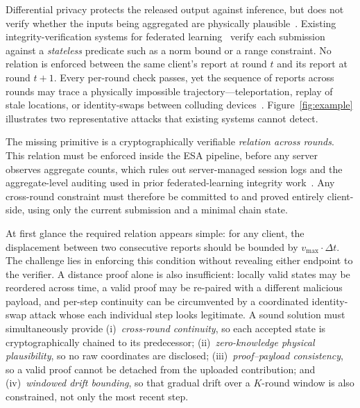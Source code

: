 \documentclass[conference]{IEEEtran}
\theoremstyle{definition}
\theoremstyle{plain}
\begin{document}
Differential privacy protects the released output against inference, but
does not verify whether the inputs being aggregated are physically
plausible~\cite{Dwork2014algorithmic}.
Existing integrity-verification systems for federated
learning~\cite{Pillutla2024RiseFL,Wang2024ZKSL,Lycklama2023RoFL,Chowdhury2022EIFFeL}
verify each submission against a \emph{stateless} predicate such as a
norm bound or a range constraint.
No relation is enforced between the same client's report at round $t$
and its report at round $t{+}1$.
Every per-round check passes, yet the sequence of reports across rounds
may trace a physically impossible trajectory---teleportation, replay of
stale locations, or identity-swaps between colluding
devices~\cite{Douceur2002Sybil}.
Figure~\ref{fig:example} illustrates two representative attacks that
existing systems cannot detect.

The missing primitive is a cryptographically verifiable \emph{relation
across rounds}.
This relation must be enforced inside the ESA pipeline, before any
server observes aggregate counts, which rules out server-managed session
logs and the aggregate-level auditing used in prior federated-learning
integrity
work~\cite{Lycklama2023RoFL,Bell2023ACORN}.
Any cross-round constraint must therefore be committed to and proved
entirely client-side, using only the current submission and a minimal
chain state.

At first glance the required relation appears simple:
for any client, the displacement between two consecutive reports should
be bounded by $v_{\max}\!\cdot\!\Delta t$.
The challenge lies in enforcing this condition without revealing either
endpoint to the verifier.
A distance proof alone is also insufficient: locally valid states may be
reordered across time, a valid proof may be re-paired with a different
malicious payload, and per-step continuity can be circumvented by
a coordinated identity-swap attack whose each individual step looks
legitimate.
A sound solution must simultaneously provide (i)~\emph{cross-round
continuity}, so each accepted state is cryptographically chained to its
predecessor; (ii)~\emph{zero-knowledge physical plausibility}, so no raw
coordinates are disclosed; (iii)~\emph{proof--payload consistency}, so a
valid proof cannot be detached from the uploaded contribution; and
(iv)~\emph{windowed drift bounding}, so that gradual drift over a
$K$-round window is also constrained, not only the most recent step.
\end{document}
